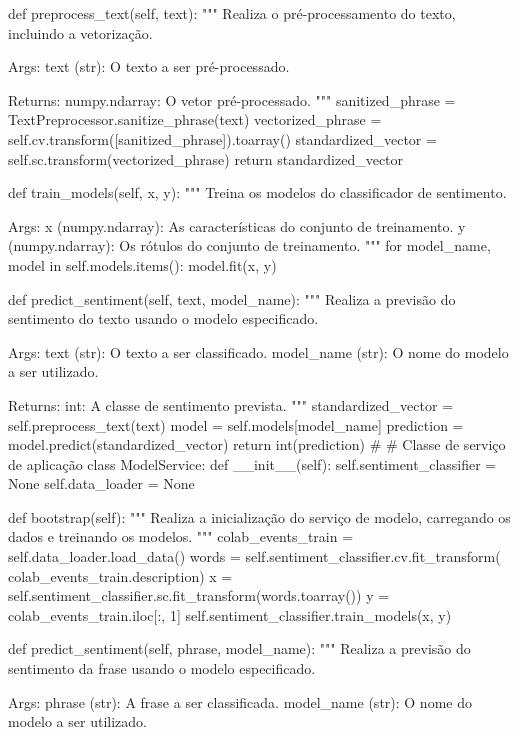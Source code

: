 \begin{codigo}[caption={API para engine de classificação de sentimento baseado em NLP utilizando o Flask como middleware http}, label={codigo:sentiment_api}, language=Python, breaklines=true]
    def preprocess_text(self, text):
        """
        Realiza o pré-processamento do texto, incluindo a vetorização.

        Args:
            text (str): O texto a ser pré-processado.

        Returns:
            numpy.ndarray: O vetor pré-processado.
        """
        sanitized_phrase = TextPreprocessor.sanitize_phrase(text)
        vectorized_phrase = self.cv.transform([sanitized_phrase]).toarray()
        standardized_vector = self.sc.transform(vectorized_phrase)
        return standardized_vector

    def train_models(self, x, y):
        """
        Treina os modelos do classificador de sentimento.

        Args:
            x (numpy.ndarray): As características do conjunto de treinamento.
            y (numpy.ndarray): Os rótulos do conjunto de treinamento.
        """
        for model_name, model in self.models.items():
            model.fit(x, y)

    def predict_sentiment(self, text, model_name):
        """
        Realiza a previsão do sentimento do texto usando o modelo especificado.

        Args:
            text (str): O texto a ser classificado.
            model_name (str): O nome do modelo a ser utilizado.

        Returns:
            int: A classe de sentimento prevista.
        """
        standardized_vector = self.preprocess_text(text)
        model = self.models[model_name]
        prediction = model.predict(standardized_vector)
        return int(prediction)
#
# Classe de serviço de aplicação
class ModelService:
    def __init__(self):
        self.sentiment_classifier = None
        self.data_loader = None

    def bootstrap(self):
        """
        Realiza a inicialização do serviço de modelo, carregando os dados e treinando os modelos.
        """
        colab_events_train = self.data_loader.load_data()
        words = self.sentiment_classifier.cv.fit_transform(
            colab_events_train.description)
        x = self.sentiment_classifier.sc.fit_transform(words.toarray())
        y = colab_events_train.iloc[:, 1]
        self.sentiment_classifier.train_models(x, y)

    def predict_sentiment(self, phrase, model_name):
        """
        Realiza a previsão do sentimento da frase usando o modelo especificado.

        Args:
            phrase (str): A frase a ser classificada.
            model_name (str): O nome do modelo a ser utilizado.


\end{codigo}
